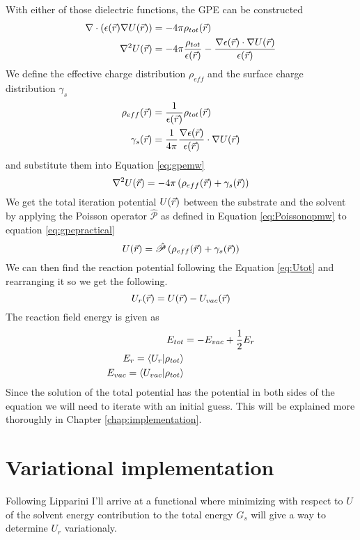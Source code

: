 \documentclass[../master_thesis.tex]{subfiles}
\begin{document}
With either of those dielectric functions, the \ac{GPE} can be constructed
\cite{Sorland, FossoTande:2013ka}
\begin{align}\label{eq:gpemw}
  \nabla\cdot (\epsilon(\vec{r})\nabla U(\vec{r})) &= -4\pi \rho_{tot}(\vec{r}) \\
  \nabla^2U(\vec{r}) &= -4\pi \frac{\rho_{tot}}{\epsilon(\vec{r})} - \frac{\nabla
  \epsilon(\vec{r})\cdot \nabla U(\vec{r})}{\epsilon(\vec{r})}
\end{align}
We define the effective charge distribution $\rho_{eff}$ and the surface charge
distribution $\gamma_s$ \cite{FossoTande:2013ka}
\begin{align}\label{eq:effrhogamma}
  \rho_{eff}(\vec{r}) &= \frac{1}{\epsilon(\vec{r})}\rho_{tot}(\vec{r}) \\
  \gamma_s(\vec{r}) &= \frac{1}{4\pi}\frac{\nabla\epsilon(\vec{r})}{\epsilon(\vec{r})}\cdot\nabla U(\vec{r})
\end{align}
and substitute them into Equation \ref{eq:gpemw}
\begin{equation}\label{eq:gpepractical}
  \nabla^2U(\vec{r}) = -4\pi\left( \rho_{eff}(\vec{r}) + \gamma_s(\vec{r})\right)
\end{equation}
We get the total iteration potential $U(\vec{r})$ between the substrate and the solvent by
applying the Poisson operator $\hat{\mathscr{P}}$ as defined in Equation
\ref{eq:Poissonopmw} to equation \ref{eq:gpepractical}
\begin{equation}
  U(\vec{r}) = \hat{\mathscr{P}}\left( \rho_{eff}(\vec{r}) + \gamma_s(\vec{r})\right)
\end{equation}
We can then find the reaction potential following the Equation \ref{eq:Utot} and
rearranging it so we get the following.
\begin{equation}
  U_r(\vec{r}) = U(\vec{r}) - U_{vac}(\vec{r})
\end{equation}
The reaction field energy is given as \cite{FossoTande:2013ka}
\begin{align}
  E_{tot} &= - E_{vac} + \frac{1}{2}E_r \\
  E_r = \braket{U_r | \rho_{tot}}\\
  E_{vac} = \braket{U_{vac}| \rho_{tot}}
\end{align}
Since the solution of the total potential has the potential in both sides of the
equation we will need to iterate with an initial guess. This will be explained
more thoroughly in Chapter \ref{chap:implementation}.

\section{Variational implementation}
Following Lipparini \cite{Lipparini:2010bg, Lipparini:2013} I'll arrive at a functional where
minimizing with respect to $U$ of the solvent energy contribution to
the total energy $G_s$ will give a way to determine $U_r$ variationaly.
\end{document}
